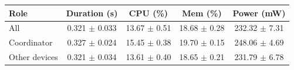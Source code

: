 \begin{tabular}{lcccc}
\hline
\textbf{Role} & \textbf{Duration (s)} & \textbf{CPU (\%)} & \textbf{Mem (\%)} & \textbf{Power (mW)} \\
\hline
All & 0.321 $\pm$ 0.033 & 13.67 $\pm$ 0.51 & 18.68 $\pm$ 0.28 & 232.32 $\pm$ 7.31 \\
Coordinator & 0.327 $\pm$ 0.024 & 15.45 $\pm$ 0.38 & 19.70 $\pm$ 0.15 & 248.06 $\pm$ 4.69 \\
Other devices & 0.321 $\pm$ 0.034 & 13.61 $\pm$ 0.40 & 18.65 $\pm$ 0.21 & 231.79 $\pm$ 6.78 \\
\hline
\end{tabular}
